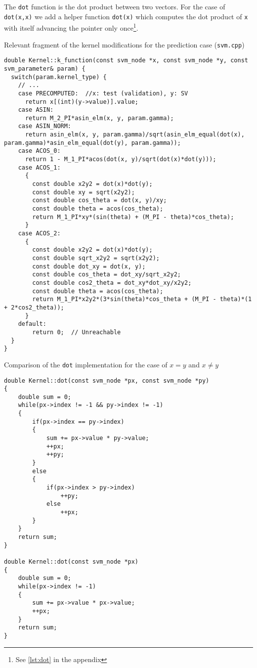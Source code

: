 The \texttt{dot} function is the dot product between two vectors. For the case
of \texttt{dot(x,x)} we add a helper function \texttt{dot(x)}
which computes the dot product of \texttt{x} with itself advancing the pointer
only once\footnote{See \cref{lst:dot} in the appendix}.

\begin{listing}
    \caption{Relevant fragment of the kernel modifications for the prediction case (\texttt{svm.cpp})}
    \label{lst:svm_cpp_k_function}
    \begin{verbatim}
double Kernel::k_function(const svm_node *x, const svm_node *y, const svm_parameter& param) {
  switch(param.kernel_type) {
    // ...
    case PRECOMPUTED:  //x: test (validation), y: SV
      return x[(int)(y->value)].value;
    case ASIN:
      return M_2_PI*asin_elm(x, y, param.gamma);
    case ASIN_NORM:
      return asin_elm(x, y, param.gamma)/sqrt(asin_elm_equal(dot(x), param.gamma)*asin_elm_equal(dot(y), param.gamma));
    case ACOS_0:
      return 1 - M_1_PI*acos(dot(x, y)/sqrt(dot(x)*dot(y)));
    case ACOS_1:
      {
        const double x2y2 = dot(x)*dot(y);
        const double xy = sqrt(x2y2);
        const double cos_theta = dot(x, y)/xy;
        const double theta = acos(cos_theta);
        return M_1_PI*xy*(sin(theta) + (M_PI - theta)*cos_theta);
      }
    case ACOS_2:
      {
        const double x2y2 = dot(x)*dot(y);
        const double sqrt_x2y2 = sqrt(x2y2);
        const double dot_xy = dot(x, y);
        const double cos_theta = dot_xy/sqrt_x2y2;
        const double cos2_theta = dot_xy*dot_xy/x2y2;
        const double theta = acos(cos_theta);
        return M_1_PI*x2y2*(3*sin(theta)*cos_theta + (M_PI - theta)*(1 + 2*cos2_theta));
      }
    default:
        return 0;  // Unreachable
  }
}
\end{verbatim}
\end{listing}

\begin{listing}
    \caption{Comparison of the \texttt{dot} implementation for the case of $x = y$ and $x \neq y$}
    \label{lst:dot}
    \begin{verbatim}
double Kernel::dot(const svm_node *px, const svm_node *py)
{
    double sum = 0;
    while(px->index != -1 && py->index != -1)
    {
        if(px->index == py->index)
        {
            sum += px->value * py->value;
            ++px;
            ++py;
        }
        else
        {
            if(px->index > py->index)
                ++py;
            else
                ++px;
        }
    }
    return sum;
}

double Kernel::dot(const svm_node *px)
{
    double sum = 0;
    while(px->index != -1)
    {
        sum += px->value * px->value;
        ++px;
    }
    return sum;
}
\end{verbatim}
\end{listing}
